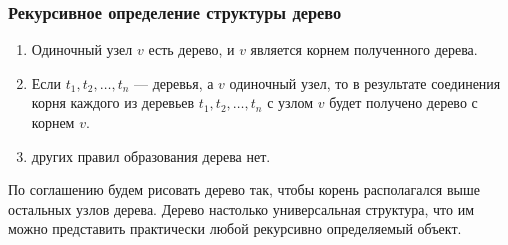 \begin{frame}
    \frametitle{Рекурсивное определение структуры \alert{дерево}}
    \begin{enumerate}
        \item<1-> Одиночный узел $v$ есть дерево, и $v$ является корнем полученного дерева.
        \item<2-> Если $t_1,t_2,\ldots,t_n$ --- деревья, а $v$ одиночный узел, то в результате соединения корня каждого из деревьев $t_1,t_2,\ldots,t_n$ с узлом $v$ будет получено дерево с корнем $v$.
        \item<3-> других правил образования дерева нет.
    \end{enumerate}
\end{frame}

По соглашению будем рисовать дерево так, чтобы корень располагался выше остальных узлов дерева. Дерево настолько универсальная структура, что им можно представить практически любой рекурсивно определяемый объект.

